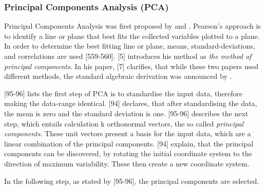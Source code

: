 \subsubsection{Principal Components Analysis (PCA)}
Principal Components Analysis was first proposed by \textcite{OnLinesAndPlanes1901} and \textcite{hotelling1933analysis}.
Pearson's approach is to identify a line or plane that best fits the collected variables plotted to a plane. In order to determine the best fitting line or plane, means, standard-deviations, and correlations are used \autocite{OnLinesAndPlanes1901}[559-560].
\textcite{hotelling1933analysis}[5] introduces his method as \textit{the method of principal components}. In his paper, \textcite{jolliffe2002PCA}[7] clarifies, that while these two papers used different methods, the standard algebraic
derivation was announced by \textcite{hotelling1933analysis}.



\textcite{han2011data}[95-96] lists the first step of PCA is to standardise the input data, therefore making the data-range identical. \textcite{DataMiningAndPredictiveAnalytics}[94] declares, that after standardising the data, the mean is zero and the standard deviation is one.
\textcite{han2011data}[95-96] describes the next step, which entails calculation k orthonormal vectors, the so called \textit{principal components}. These unit vectors present a basis for the input data, which are a linear combination of the principal components. \textcite{DataMiningAndPredictiveAnalytics}[94] explain, that the principal components can be discovered, by rotating the initial coordinate system to the direction of maximum variability. These then create a new coordinate system.

In the following step, as stated by \textcite{han2011data}[95-96], the principal components are selected. 


